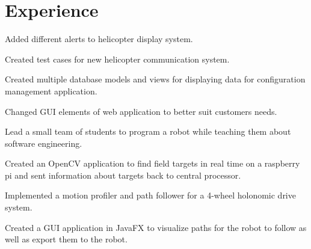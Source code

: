\documentclass[]{deedy-resume-openfont}
\begin{document}

\section{Experience}
\hfill {}
\begin{tightemize}
	\item Added different alerts to helicopter display system.
	\item Created test cases for new helicopter communication system.
	\item Created multiple database models and views for displaying data for configuration management application.
	\item Changed GUI elements of web application to better suit customers needs.
\end{tightemize}
\sectionsep

\hfill {}
\begin{tightemize}
	\item Lead a small team of students to program a robot while teaching them about software engineering.
	\item Created an OpenCV application to find field targets in real time on a raspberry pi and sent information about targets back to central processor.
	\item Implemented a motion profiler and path follower for a 4-wheel holonomic drive system.
	\item Created a GUI application in JavaFX to visualize paths for the robot to follow as well as export them to the robot.
\end{tightemize}
\sectionsep
\end{document}
